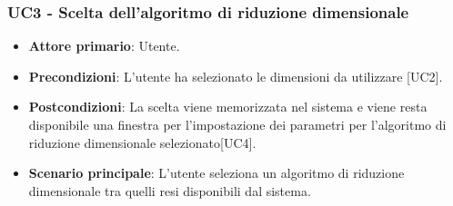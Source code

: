 \subsubsection{UC3 - Scelta dell'algoritmo di riduzione dimensionale}
\begin{itemize}
	\item \textbf{Attore primario}: Utente.
	\item \textbf{Precondizioni}: L'utente ha selezionato le dimensioni da utilizzare [UC2].
	\item \textbf{Postcondizioni}: La scelta viene memorizzata nel sistema e viene resta disponibile una finestra per l'impostazione dei parametri per l'algoritmo di riduzione dimensionale selezionato[UC4].
	\item \textbf{Scenario principale}: L'utente seleziona un algoritmo di riduzione dimensionale tra quelli resi disponibili dal sistema.
\end{itemize}